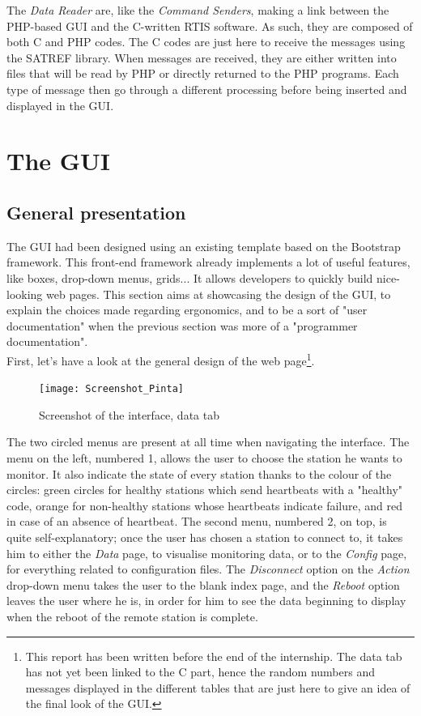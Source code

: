 \documentclass{themeensg}
\begin{document}
The \textit{Data Reader} are, like the \textit{Command Senders}, making a link between the PHP-based GUI and the C-written RTIS software. As such, they are composed of both C and PHP codes. The C codes are just here to receive the messages using the SATREF library. When messages are received, they are either written into files that will be read by PHP or directly returned to the PHP programs.
Each type of message then go through a different processing before being inserted and displayed in the GUI.\\


\clearpage
\section{The GUI}

\subsection{General presentation}
The GUI had been designed using an existing template based on the Bootstrap framework. This front-end framework already implements a lot of useful features, like boxes, drop-down menus, grids... It allows developers to quickly build nice-looking web pages. This section aims at showcasing the design of the GUI, to explain the choices made regarding ergonomics, and to be a sort of "user documentation" when the previous section was more of a "programmer documentation".\\

First, let's have a look at the general design of the web page\footnote{This report has been written before the end of the internship. The data tab has not yet been linked to the C part, hence the random numbers and messages displayed in the different tables that are just here to give an idea of the final look of the GUI.}.\\

\begin{figure}[ht]
	\centering
	\texttt{[image: Screenshot\_Pinta]}
	\caption{Screenshot of the interface, data tab}
\end{figure}

The two circled menus are present at all time when navigating the interface. The menu on the left, numbered 1, allows the user to choose the station he wants to monitor. It also indicate the state of every station thanks to the colour of the circles: green circles for healthy stations which send heartbeats with a "healthy" code, orange for non-healthy  stations whose heartbeats indicate failure, and red in case of an absence of heartbeat.
The second menu, numbered 2, on top, is quite self-explanatory; once the user has chosen a station to connect to, it takes him to either the \textit{Data} page, to visualise monitoring data, or to the \textit{Config} page, for everything related to configuration files. The \textit{Disconnect} option on the \textit{Action} drop-down menu takes the user to the blank index page, and the \textit{Reboot} option leaves the user where he is, in order for him to see the data beginning to display when the reboot of the remote station is complete.\\
\end{document}
